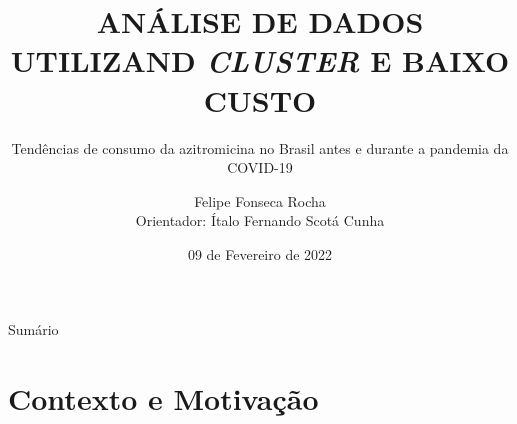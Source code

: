 \documentclass[10pt,brazil]{beamer}
\theoremstyle{definition}
\begin{document}

\title[]{ANÁLISE DE DADOS UTILIZAND \emph{CLUSTER} E BAIXO CUSTO}
\subtitle{Tendências de consumo da
azitromicina no Brasil antes e durante a
pandemia da COVID-19}


\author[Felipe Rocha]{Felipe Fonseca Rocha \\
  \vspace{0.25cm}
  Orientador: Ítalo Fernando Scotá Cunha}
\date{09 de Fevereiro de 2022}

\AtBeginSubsection{%
  \begin{frame}
    \tableofcontents[currentsection=show,sectionstyle=show/shaded,subsectionstyle=show/shaded/hide]
  \end{frame}
}
\frame{\maketitle}


\begin{frame}{Sumário}
  \tableofcontents[hideallsubsections]
\end{frame}


%
%

\section{Contexto e Motivação}
\end{document}

